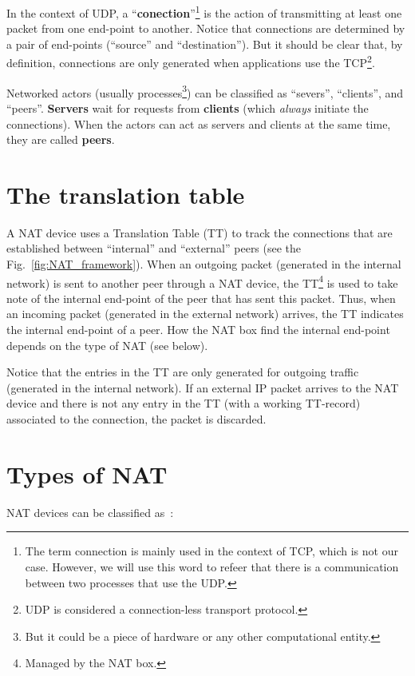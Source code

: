In the context of UDP, a ``\textbf{conection}''\footnote{The term
connection is mainly used in the context of TCP, which is not our
case. However, we will use this word to refeer that there is a
communication between two processes that use the UDP.} is the action
of transmitting at least one packet from one end-point to
another. Notice that connections are determined by a pair of
end-points (``source'' and ``destination''). But it should be clear
that, by definition, connections are only generated when applications
use the TCP\footnote{UDP is considered a connection-less transport
protocol.}.

Networked actors (usually processes\footnote{But it could be a piece
of hardware or any other computational entity.}) can be classified as
``severs'', ``clients'', and ``peers''. \textbf{Servers} wait for
requests from \textbf{clients} (which \emph{always} initiate the
connections). When the actors can act as servers and clients at the
same time, they are called \textbf{peers}.

\section{The translation table}

A NAT device uses a Translation Table (TT) to track the connections
that are established between ``internal'' and ``external'' peers (see
the Fig.~\ref{fig:NAT_framework}). When an outgoing packet (generated
in the internal network) is sent to another peer through a NAT device,
the TT\footnote{Managed by the NAT box.} is used to take note of the
internal end-point of the peer that has sent this packet. Thus, when
an incoming packet (generated in the external network) arrives, the TT
indicates the internal end-point of a peer. How the NAT box find the
internal end-point depends on the type of NAT (see below).

Notice that the entries in the TT are only generated for outgoing
traffic (generated in the internal network). If an external IP packet
arrives to the NAT device and there is not any entry in the TT (with a
working TT-record) associated to the connection, the packet is
discarded.

\section{Types of NAT}

NAT devices can be classified as~\cite{jennings2007network}:

